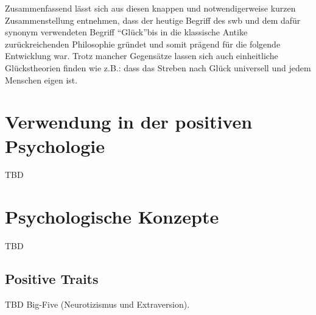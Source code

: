 Zusammenfassend lässt sich aus diesen knappen und notwendigerweise kurzen Zusammenstellung entnehmen, dass der heutige Begriff des \gls{swb} und dem dafür synonym verwendeten Begriff \textquotedblleft Glück\textquotedblright  bis in die klassische Antike zurückreichenden Philosophie gründet und somit prägend für die folgende Entwicklung war. Trotz mancher Gegensätze lassen sich auch einheitliche Glückstheorien finden wie z.B.: dass das Streben nach Glück universell und jedem Menschen eigen ist. 
  
\section{Verwendung in der positiven Psychologie}\label{sec.swbPospsy}
TBD

\section{Psychologische Konzepte}\label{sec.swbKonzept}
TBD

\subsection{Positive Traits}\label{subsec.swbTraits}
TBD Big-Five (Neurotizismus und Extraversion).


